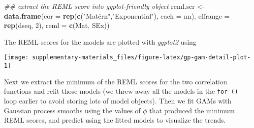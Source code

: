 \documentclass[12pt,]{article}
\newenvironment{Shaded}{\begin{snugshade}}{\end{snugshade}}
\newcommand{\CommentTok}[1]{\textcolor[rgb]{0.56,0.35,0.01}{\textit{#1}}}
\newcommand{\DataTypeTok}[1]{\textcolor[rgb]{0.13,0.29,0.53}{#1}}
\newcommand{\DecValTok}[1]{\textcolor[rgb]{0.00,0.00,0.81}{#1}}
\newcommand{\KeywordTok}[1]{\textcolor[rgb]{0.13,0.29,0.53}{\textbf{#1}}}
\newcommand{\NormalTok}[1]{#1}
\newcommand{\OperatorTok}[1]{\textcolor[rgb]{0.81,0.36,0.00}{\textbf{#1}}}
\newcommand{\StringTok}[1]{\textcolor[rgb]{0.31,0.60,0.02}{#1}}
\begin{document}
\begin{Shaded}
\begin{Highlighting}[]
\CommentTok{## extract the REML score into ggplot-friendly object}
\NormalTok{reml.scr <-}\StringTok{ }\KeywordTok{data.frame}\NormalTok{(}\DataTypeTok{cor =} \KeywordTok{rep}\NormalTok{(}\KeywordTok{c}\NormalTok{(}\StringTok{"Matérn"}\NormalTok{,}\StringTok{"Exponential"}\NormalTok{), }\DataTypeTok{each =}\NormalTok{ nn),}
                       \DataTypeTok{effrange =} \KeywordTok{rep}\NormalTok{(dseq, }\DecValTok{2}\NormalTok{),}
                       \DataTypeTok{reml =} \KeywordTok{c}\NormalTok{(Mat, SEx))}
\end{Highlighting}
\end{Shaded}

The REML scores for the models are plotted with \emph{ggplot2} using

\begin{Shaded}
\end{Shaded}

\begin{center}\texttt{[image: supplementary-materials\_files/figure-latex/gp-gam-detail-plot-1]} \end{center}

Next we extract the minimum of the REML scores for the two correlation
functions and refit those models (we threw away all the models in the
\texttt{for\ ()} loop earlier to avoid storing lots of model objects).
Then we fit GAMs with Gaussian process smooths using the values of
\(\phi\) that produced the minimum REML scores, and predict using the
fitted models to visualize the trends.
\end{document}
